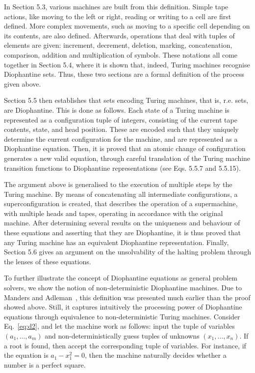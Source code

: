 \documentclass[12pt]{article}
\begin{document}
In Section 5.3, various machines are built from this definition. Simple tape actions, like moving to the left or right, reading or writing to a cell are first defined. More complex movements, such as moving to a specific cell depending on its contents, are also defined. Afterwards, operations that deal with tuples of elements are given: increment, decrement, deletion, marking, concatenation, comparison, addition and multiplication of symbols. These notations all come together in Section 5.4, where it is shown that, indeed, Turing machines recognise Diophantine sets. Thus, these two sections are a formal definition of the process given above.

Section 5.5 then establishes that sets encoding Turing machines, that is, r.e. sets, are Diophantine. This is done as follows. Each state of a Turing machine is represented as a configuration tuple of integers, consisting of the current tape contents, state, and head position. These are encoded such that they uniquely determine the current configuration for the machine, and are represented as a Diophantine equation. Then, it is proved that an atomic change of configuration generates a new valid equation, through careful translation of the Turing machine transition functions to Diophantine representations (see Eqs. 5.5.7 and 5.5.15).

The argument above is generalised to the execution of multiple steps by the Turing machine. By means of concatenating all intermediate configurations, a superconfiguration is created, that describes the operation of a supermachine, with multiple heads and tapes, operating in accordance with the original machine. After determining several results on the uniqueness and behaviour of these equations and asserting that they are Diophantine, it is thus proved that any Turing machine has an equivalent Diophantine representation. Finally, Section 5.6 gives an argument on the unsolvability of the halting problem through the lenses of these equations.

To further illustrate the concept of Diophantine equations as general problem solvers, we show the notion of non-deterministic Diophantine machines. Due to Manders and Adleman~\cite[Sec. 3]{Manders:article:1978:apr}, this definition was presented much earlier than the proof showed above. Still, it captures intuitively the processing power of Diophantine equations through equivalence to non-deterministic Turing machines. Consider Eq.~\ref{eq:d2}, and let the machine work as follows: input the tuple of variables $(a_{1}, \dots, a_{m})$ and non-deterministically guess tuples of unknowns $(x_{1}, \dots, x_{n})$. If a root is found, then accept the corresponding tuple of variables. For instance, if the equation is $a_{1} - x_{1}^{2} = 0$, then the machine naturally decides whether a number is a perfect square.
\end{document}
